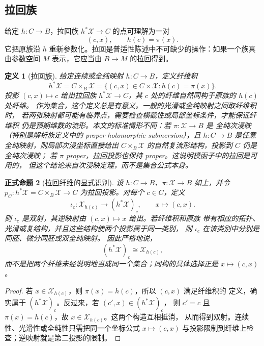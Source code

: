\documentclass[UTF8,fontset=none,a4paper,11pt]{ctexart}
\theoremstyle{foundation-definition}
\newtheorem{definition}{定义}[section]
\theoremstyle{foundation-theorem}
\theoremstyle{foundation-proposition}
\newtheorem{proposition}[definition]{正式命题}
\theoremstyle{foundation-example}
\theoremstyle{foundation-remark}
\theoremstyle{foundation-theorem}
\begin{document}
\subsection{拉回族}

给定 \(h:C\to B\)，拉回族 \(h^*\mathcal X\to C\) 的点可理解为一对
\[
(c,x),\qquad h(c)=\pi(x).
\]
它把原族沿 \(h\) 重新参数化。拉回是普适性陈述中不可缺少的操作：如果一个族真由参数空间 \(M\) 表示，它应当由 \(B\to M\) 的拉回得到。

\begin{definition}[拉回族]\label{def:pullback}
给定连续或全纯映射 \(h:C\to B\)，定义纤维积
\[
h^*\mathcal X=C\times_B\mathcal X
=\{(c,x)\in C\times\mathcal X:h(c)=\pi(x)\}.
\]
投影 \((c,x)\mapsto c\) 给出拉回族 \(h^*\mathcal X\to C\)，其 \(c\) 处的纤维自然同构于原族的 \(h(c)\) 处纤维。
作为集合，这个定义总是有意义。一般的光滑或全纯映射之间取纤维积时，
若两张映射都可能有临界点，需要检查横截性或局部坐标条件，才能保证纤维积
仍是预期维数的流形。本文的标准情形不同：若 \(\pi:\mathcal X\to B\) 是
全纯次浸映（特别是解析族定义中的 proper holomorphic submersion），且
\(h:C\to B\) 是任意全纯映射，则局部次浸坐标直接给出
\(C\times_B\mathcal X\) 的自然复流形结构，投影到 \(C\) 仍是全纯次浸映；
若 \(\pi\) proper，拉回投影也保持 proper。这说明模函子中的拉回是可用的，
但这个结论来自次浸映定理，而不是集合公式本身。
\end{definition}

\begin{proposition}[拉回纤维的显式识别]\label{prop:pullback-fiber}
设 \(h:C\to B\)、\(\pi:\mathcal X\to B\) 如上，并令
\(p_C:h^*\mathcal X=C\times_B\mathcal X\to C\) 为拉回投影。对每个
\(c\in C\)，定义
\[
\iota_c:\mathcal X_{h(c)}\longrightarrow (h^*\mathcal X)_c,
\qquad
x\longmapsto(c,x).
\]
则 \(\iota_c\) 是双射，其逆映射由 \((c,x)\mapsto x\) 给出。若纤维积和原族
带有相应的拓扑、光滑或复结构，并且这些结构使两个投影属于同一类别，
则 \(\iota_c\) 在该类别中分别是同胚、微分同胚或双全纯映射。
因此严格地说，
\[
(h^*\mathcal X)_c\cong\mathcal X_{h(c)},
\]
而不是把两个纤维未经说明地当成同一个集合；同构的具体选择正是
\(x\mapsto(c,x)\)。
\end{proposition}

\begin{proof}
若 \(x\in\mathcal X_{h(c)}\)，则 \(\pi(x)=h(c)\)，所以 \((c,x)\) 满足纤维积的
定义，确实属于 \((h^*\mathcal X)_c\)。反过来，若 \((c',x)\in(h^*\mathcal X)_c\)，
则 \(c'=c\) 且 \(\pi(x)=h(c)\)，故 \(x\in\mathcal X_{h(c)}\)。这两个构造互相抵消，
从而得到双射。连续性、光滑性或全纯性只需把同一个坐标公式
\(x\mapsto(c,x)\) 与投影限制到纤维上检查；逆映射就是第二投影的限制。
\end{proof}
\end{document}

